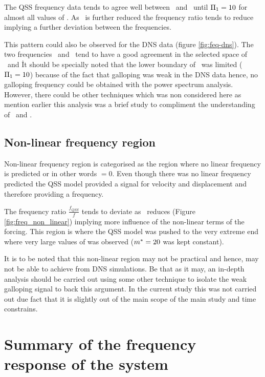 The QSS frequency data tends to agree well between \freqlin\ and \freqqss\ until $\Pi_1=10$ for almost all values of \massdamp. As \massstiff\ is further reduced the frequency ratio tends to reduce implying a further deviation between the frequencies.   


 
 This pattern could also be observed for the DNS data (figure \ref{fig:feq-dns}). The two frequencies \freqlin\ and \freqdns\ tend to have a good agreement in the selected space of \massstiff\ and \massdamp\. It should be specially noted that the lower boundary of \massstiff\ was limited ($\Pi_1=10$) because of the fact that galloping was weak in the DNS data hence, no galloping frequency could be obtained with the power spectrum analysis. However, there could be other techniques which was non considered here as mention earlier this analysis was a brief study to compliment the understanding of \massstiff\ and \massdamp. 


\subsection{Non-linear frequency region}

Non-linear frequency region is categorised as the region where no linear frequency is predicted or in other words \freqlin$=0$. Even though there was no linear frequency predicted the QSS model provided a signal for velocity and displacement and therefore providing a frequency. 



The frequency ratio $\frac{f_{QSS}}{f}$ tends to deviate as \massstiff\ reduces (Figure \ref{fig:freq_non_linear}) implying more influence of the non-linear terms of the forcing. This region is where the QSS model was pushed to the very extreme end where very large values of \ustar was observed ($m^{*}=20$ was kept constant). 

It is to be noted that this non-linear region may not be practical and hence, may not be able to achieve from DNS simulations. Be that as it may, an in-depth analysis should be carried out using some other technique to isolate the weak galloping signal to back this argument. In the current study this was not carried out due fact that it is slightly out of the main scope of the main study and time constrains. 

\section{Summary of the frequency response of the system}

